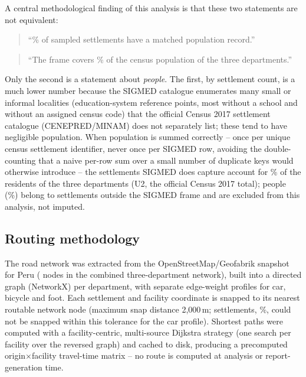 A central methodological finding of this analysis is that these two statements are not equivalent:
\begin{quote}
``\PopulationMatchedPct\% of sampled settlements have a matched population record.''
\end{quote}
\begin{quote}
``The frame covers \FrameCoveragePct\% of the census population of the three departments.''
\end{quote}
Only the second is a statement about \emph{people}. The first, by settlement count, is a much lower number because the SIGMED catalogue enumerates many small or informal localities (education-system reference points, most without a school and without an assigned census code) that the official Census 2017 settlement catalogue (CENEPRED/MINAM) does not separately list; these tend to have negligible population. When population is summed correctly -- once per unique census settlement identifier, never once per SIGMED row, avoiding the double-counting that a naive per-row sum over a small number of duplicate keys would otherwise introduce -- the settlements SIGMED does capture account for \FrameCoveragePct\% of the \UTwoPopulation{} residents of the three departments (U2, the official Census 2017 total); \OutsideFramePop{} people (\OutsideFramePct\%) belong to settlements outside the SIGMED frame and are excluded from this analysis, not imputed.

\subsection{Routing methodology}
\label{sec:routing}

The road network was extracted from the \OsmCutoffDate{} OpenStreetMap/Geofabrik snapshot for Peru (\NetworkNodes{} nodes in the combined three-department network), built into a directed graph (NetworkX) per department, with separate edge-weight profiles for car, bicycle and foot. Each settlement and facility coordinate is snapped to its nearest routable network node (maximum snap distance 2{,}000\,m; \CarSnapFailed{} settlements, \CarSnapFailedPct\%, could not be snapped within this tolerance for the car profile). Shortest paths were computed with a facility-centric, multi-source Dijkstra strategy (one search per facility over the reversed graph) and cached to disk, producing a precomputed origin$\times$facility travel-time matrix -- no route is computed at analysis or report-generation time.

